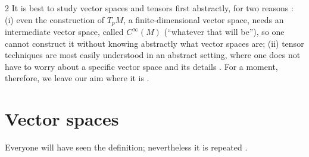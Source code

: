 \begin{paracol}{2}
It is best to study vector spaces and tensors first abstractly, for two reasons : (i) even the construction of $T_pM$, a finite-dimensional vector space, needs an intermediate vector space, called
$C^\infty(M)$ (``whatever that will be''), so one cannot construct it without knowing abstractly what vector spaces are; (ii) tensor techniques are most easily understood in an abstract setting, where one does not have to worry about a specific
vector space and its details . For a moment, therefore, we leave our aim where it is .

\section{Vector spaces}\label{sec:c03-vs}

Everyone will have seen the definition; nevertheless it is repeated .


\end{paracol}
